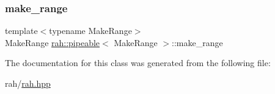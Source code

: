 \subsubsection{\texorpdfstring{make\_range}{make\_range}}
{\footnotesize\ttfamily template$<$typename Make\+Range$>$ \\
Make\+Range \mbox{\hyperlink{structrah_1_1pipeable}{rah\+::pipeable}}$<$ Make\+Range $>$\+::make\+\_\+range}



The documentation for this class was generated from the following file\+:\begin{DoxyCompactItemize}
\item 
rah/\mbox{\hyperlink{rah_8hpp}{rah.\+hpp}}\end{DoxyCompactItemize}
